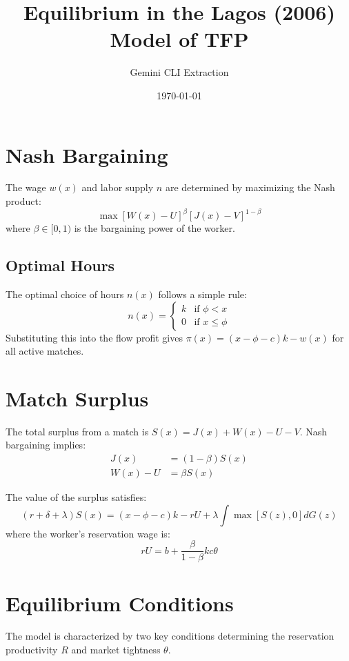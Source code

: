 \documentclass[11pt]{article}
\title{Equilibrium in the Lagos (2006) Model of TFP}
\author{Gemini CLI Extraction}
\date{\today}
\begin{document}
\maketitle

\section{Nash Bargaining}
The wage $w(x)$ and labor supply $n$ are determined by maximizing the Nash product:
\begin{equation}
\max [W(x) - U]^\beta [J(x) - V]^{1-\beta}
\end{equation}
where $\beta \in [0, 1)$ is the bargaining power of the worker.

\subsection{Optimal Hours}
The optimal choice of hours $n(x)$ follows a simple rule:
\begin{equation}
n(x) = 
\begin{cases} 
k & \text{if } \phi < x \\
0 & \text{if } x \le \phi 
\end{cases}
\end{equation}
Substituting this into the flow profit gives $\pi(x) = (x - \phi - c)k - w(x)$ for all active matches.

\section{Match Surplus}
The total surplus from a match is $S(x) = J(x) + W(x) - U - V$. Nash bargaining implies:
\begin{align}
J(x) &= (1 - \beta)S(x) \\
W(x) - U &= \beta S(x)
\end{align}

The value of the surplus satisfies:
\begin{equation}
(r + \delta + \lambda)S(x) = (x - \phi - c)k - rU + \lambda \int \max[S(z), 0] dG(z)
\end{equation}
where the worker's reservation wage is:
\begin{equation}
rU = b + \frac{\beta}{1-\beta} k c \theta
\end{equation}

\section{Equilibrium Conditions}
The model is characterized by two key conditions determining the reservation productivity $R$ and market tightness $\theta$.
\end{document}
